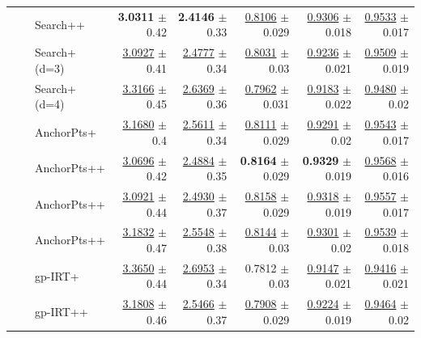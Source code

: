 \begin{longtable}{llp{}rrrrr}
 &  & Search++ & \textbf{3.0311} {\scriptsize $\pm$ 0.42} & \textbf{2.4146} {\scriptsize $\pm$ 0.33} & \underline{0.8106} {\scriptsize $\pm$ 0.029} & \underline{0.9306} {\scriptsize $\pm$ 0.018} & \underline{0.9533} {\scriptsize $\pm$ 0.017} \\
 &  & Search+ (d=3) & \underline{3.0927} {\scriptsize $\pm$ 0.41} & \underline{2.4777} {\scriptsize $\pm$ 0.34} & \underline{0.8031} {\scriptsize $\pm$ 0.03} & \underline{0.9236} {\scriptsize $\pm$ 0.021} & \underline{0.9509} {\scriptsize $\pm$ 0.019} \\
 &  & Search+ (d=4) & \underline{3.3166} {\scriptsize $\pm$ 0.45} & \underline{2.6369} {\scriptsize $\pm$ 0.36} & \underline{0.7962} {\scriptsize $\pm$ 0.031} & \underline{0.9183} {\scriptsize $\pm$ 0.022} & \underline{0.9480} {\scriptsize $\pm$ 0.02} \\
 &  & AnchorPts+ & \underline{3.1680} {\scriptsize $\pm$ 0.4} & \underline{2.5611} {\scriptsize $\pm$ 0.34} & \underline{0.8111} {\scriptsize $\pm$ 0.029} & \underline{0.9291} {\scriptsize $\pm$ 0.02} & \underline{0.9543} {\scriptsize $\pm$ 0.017} \\
 &  & AnchorPts++ & \underline{3.0696} {\scriptsize $\pm$ 0.42} & \underline{2.4884} {\scriptsize $\pm$ 0.35} & \textbf{0.8164} {\scriptsize $\pm$ 0.029} & \textbf{0.9329} {\scriptsize $\pm$ 0.019} & \underline{0.9568} {\scriptsize $\pm$ 0.016} \\
 &  & AnchorPts++ & \underline{3.0921} {\scriptsize $\pm$ 0.44} & \underline{2.4930} {\scriptsize $\pm$ 0.37} & \underline{0.8158} {\scriptsize $\pm$ 0.029} & \underline{0.9318} {\scriptsize $\pm$ 0.019} & \underline{0.9557} {\scriptsize $\pm$ 0.017} \\
 &  & AnchorPts++ & \underline{3.1832} {\scriptsize $\pm$ 0.47} & \underline{2.5548} {\scriptsize $\pm$ 0.38} & \underline{0.8144} {\scriptsize $\pm$ 0.03} & \underline{0.9301} {\scriptsize $\pm$ 0.02} & \underline{0.9539} {\scriptsize $\pm$ 0.018} \\
 &  & gp-IRT+ & \underline{3.3650} {\scriptsize $\pm$ 0.44} & \underline{2.6953} {\scriptsize $\pm$ 0.34} & 0.7812 {\scriptsize $\pm$ 0.03} & \underline{0.9147} {\scriptsize $\pm$ 0.021} & \underline{0.9416} {\scriptsize $\pm$ 0.021} \\
 &  & gp-IRT++ & \underline{3.1808} {\scriptsize $\pm$ 0.46} & \underline{2.5466} {\scriptsize $\pm$ 0.37} & \underline{0.7908} {\scriptsize $\pm$ 0.029} & \underline{0.9224} {\scriptsize $\pm$ 0.019} & \underline{0.9464} {\scriptsize $\pm$ 0.02} \\

\end{longtable}
